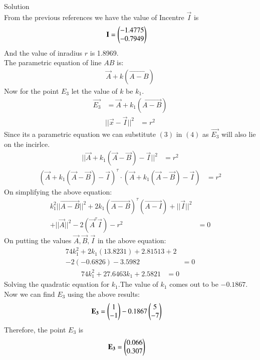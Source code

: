 \documentclass[journal,12pt,twocolumn]{IEEEtran}
\theoremstyle{remark}
\begin{document}
Solution\\
From the previous references we have the value of Incentre $\vec{I}$ is
\begin{align}
\mathbf{I} &=\begin{pmatrix}-1.4775\\-0.7949\end{pmatrix}
\end{align}
And the value of inradius $r$ is 1.8969.\\
The parametric equation of line $AB$ is:
\begin{align}
\vec{A}+k(\vec{A-B})
\end{align}
Now for the point $E_3$ let the value of $k$ be $k_1$. 
\begin{align}
\vec{E_3} &=\vec{A}+k_1(\vec{A-B})
\end{align}
\begin{align}
||\vec{x}-\vec{I}||^2 &= r^2
\end{align}
Since its a parametric equation we can substitute $(3)$ in $(4)$ as $\vec{E_3}$ will also lie on the incirlce.
\begin{align}
||\vec{A}+k_1(\vec{A}-\vec{B})-\vec{I}||^2 &= r^2
\end{align}
\begin{align}
(\vec{A}+k_1(\vec{A}-\vec{B})-\vec{I})^\tau \cdot (\vec{A}+k_1(\vec{A}-\vec{B})-\vec{I}) &= r^2
\end{align}
On simplifying the above equation:
\begin{align}
k_1^2||\vec{A-B}||^2+2k_1(\vec{A-B})^\tau(\vec{A-I})+||\vec{I}||^2 \nonumber \\
+||\vec{A}||^2-2(\vec{A}^\tau\vec{I})-r^2 &= 0
\end{align}
On putting the values $\vec{A}, \vec{B}, \vec{I}$ in the above equation:
\begin{align}
74k_1^2+2k_1(13.8231)+2.81513+2 \nonumber \\
-2(-0.6826)-3.5982 &= 0
\end{align}
\begin{align}
74k_1^2+27.6463k_1+2.5821 &= 0
\end{align}
Solving the quadratic equation for $k_1$.The value of $k_1$ comes out to be $-0.1867$.
Now we can find $E_3$ using the above results:
\begin{align}
\mathbf{E_3} &=\begin{pmatrix}1\\-1\end{pmatrix}-0.1867\begin{pmatrix}5\\-7\end{pmatrix}
\end{align}
Therefore, the point $E_3$ is
\begin{align}
\mathbf{E_3} &=\begin{pmatrix}0.066\\0.307\end{pmatrix}
\end{align}
\end{document}
